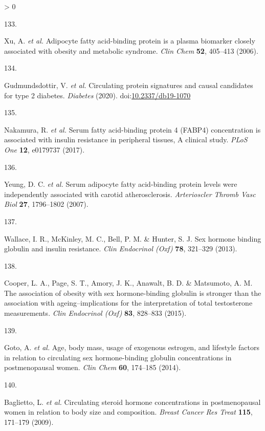 \documentclass[11pt,twoside]{bristolthesis}
\newlength{\cslhangindent}
\newlength{\csllabelwidth}
\newenvironment{CSLReferences}[2] %
 {%
  \setlength{\parindent}{0pt}
  \ifodd #1 \everypar{\setlength{\hangindent}{\cslhangindent}}\ignorespaces\fi
  \ifnum #2 > 0
  \setlength{\parskip}{#2\baselineskip}
  \fi
 }%
 {}
\newcommand{\CSLLeftMargin}[1]{\parbox[t]{\csllabelwidth}{#1}}
\newcommand{\CSLRightInline}[1]{\parbox[t]{\linewidth - \csllabelwidth}{#1}\break}
\begin{document}
\begin{CSLReferences}{0}{0}
\leavevmode\hypertarget{ref-Xu2006}{}%
\CSLLeftMargin{133. }
\CSLRightInline{Xu, A. \emph{et al.} {Adipocyte fatty acid-binding protein is a plasma biomarker closely associated with obesity and metabolic syndrome}. \emph{Clin Chem} \textbf{52}, 405--413 (2006).}

\leavevmode\hypertarget{ref-Gudmundsdottir2020}{}%
\CSLLeftMargin{134. }
\CSLRightInline{Gudmundsdottir, V. \emph{et al.} {Circulating protein signatures and causal candidates for type 2 diabetes}. \emph{Diabetes} (2020). doi:\href{https://doi.org/10.2337/db19-1070}{10.2337/db19-1070}}

\leavevmode\hypertarget{ref-Nakamura2017}{}%
\CSLLeftMargin{135. }
\CSLRightInline{Nakamura, R. \emph{et al.} {Serum fatty acid-binding protein 4 (FABP4) concentration is associated with insulin resistance in peripheral tissues, A clinical study}. \emph{PLoS One} \textbf{12}, e0179737 (2017).}

\leavevmode\hypertarget{ref-Yeung2007}{}%
\CSLLeftMargin{136. }
\CSLRightInline{Yeung, D. C. \emph{et al.} {Serum adipocyte fatty acid-binding protein levels were independently associated with carotid atherosclerosis}. \emph{Arterioscler Thromb Vasc Biol} \textbf{27}, 1796--1802 (2007).}

\leavevmode\hypertarget{ref-Wallace2013}{}%
\CSLLeftMargin{137. }
\CSLRightInline{Wallace, I. R., McKinley, M. C., Bell, P. M. \& Hunter, S. J. {Sex hormone binding globulin and insulin resistance}. \emph{Clin Endocrinol (Oxf)} \textbf{78}, 321--329 (2013).}

\leavevmode\hypertarget{ref-Cooper2015}{}%
\CSLLeftMargin{138. }
\CSLRightInline{Cooper, L. A., Page, S. T., Amory, J. K., Anawalt, B. D. \& Matsumoto, A. M. {The association of obesity with sex hormone-binding globulin is stronger than the association with ageing--implications for the interpretation of total testosterone measurements}. \emph{Clin Endocrinol (Oxf)} \textbf{83}, 828--833 (2015).}

\leavevmode\hypertarget{ref-Goto2014}{}%
\CSLLeftMargin{139. }
\CSLRightInline{Goto, A. \emph{et al.} {Age, body mass, usage of exogenous estrogen, and lifestyle factors in relation to circulating sex hormone-binding globulin concentrations in postmenopausal women}. \emph{Clin Chem} \textbf{60}, 174--185 (2014).}

\leavevmode\hypertarget{ref-Baglietto2009}{}%
\CSLLeftMargin{140. }
\CSLRightInline{Baglietto, L. \emph{et al.} {Circulating steroid hormone concentrations in postmenopausal women in relation to body size and composition}. \emph{Breast Cancer Res Treat} \textbf{115}, 171--179 (2009).}


\end{CSLReferences}
\end{document}
